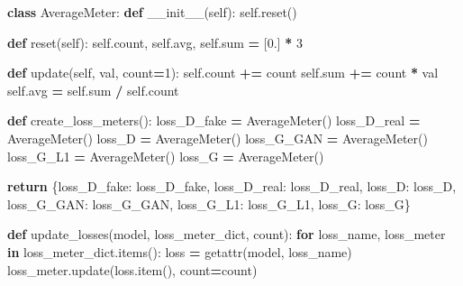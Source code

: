 \documentclass[
]{article}
\newenvironment{Shaded}{\begin{snugshade}}{\end{snugshade}}
\newcommand{\BuiltInTok}[1]{#1}
\newcommand{\ControlFlowTok}[1]{\textcolor[rgb]{0.13,0.29,0.53}{\textbf{#1}}}
\newcommand{\DecValTok}[1]{\textcolor[rgb]{0.00,0.00,0.81}{#1}}
\newcommand{\FloatTok}[1]{\textcolor[rgb]{0.00,0.00,0.81}{#1}}
\newcommand{\FunctionTok}[1]{\textcolor[rgb]{0.00,0.00,0.00}{#1}}
\newcommand{\KeywordTok}[1]{\textcolor[rgb]{0.13,0.29,0.53}{\textbf{#1}}}
\newcommand{\NormalTok}[1]{#1}
\newcommand{\OperatorTok}[1]{\textcolor[rgb]{0.81,0.36,0.00}{\textbf{#1}}}
\newcommand{\StringTok}[1]{\textcolor[rgb]{0.31,0.60,0.02}{#1}}
\newcommand{\VariableTok}[1]{\textcolor[rgb]{0.00,0.00,0.00}{#1}}
\begin{document}
\begin{Shaded}
\begin{Highlighting}[]
\KeywordTok{class}\NormalTok{ AverageMeter:}
    \KeywordTok{def} \FunctionTok{\_\_init\_\_}\NormalTok{(}\VariableTok{self}\NormalTok{):}
        \VariableTok{self}\NormalTok{.reset()}
        
    \KeywordTok{def}\NormalTok{ reset(}\VariableTok{self}\NormalTok{):}
        \VariableTok{self}\NormalTok{.count, }\VariableTok{self}\NormalTok{.avg, }\VariableTok{self}\NormalTok{.}\BuiltInTok{sum} \OperatorTok{=}\NormalTok{ [}\FloatTok{0.}\NormalTok{] }\OperatorTok{*} \DecValTok{3}
    
    \KeywordTok{def}\NormalTok{ update(}\VariableTok{self}\NormalTok{, val, count}\OperatorTok{=}\DecValTok{1}\NormalTok{):}
        \VariableTok{self}\NormalTok{.count }\OperatorTok{+=}\NormalTok{ count}
        \VariableTok{self}\NormalTok{.}\BuiltInTok{sum} \OperatorTok{+=}\NormalTok{ count }\OperatorTok{*}\NormalTok{ val}
        \VariableTok{self}\NormalTok{.avg }\OperatorTok{=} \VariableTok{self}\NormalTok{.}\BuiltInTok{sum} \OperatorTok{/} \VariableTok{self}\NormalTok{.count}

\KeywordTok{def}\NormalTok{ create\_loss\_meters():}
\NormalTok{    loss\_D\_fake }\OperatorTok{=}\NormalTok{ AverageMeter()}
\NormalTok{    loss\_D\_real }\OperatorTok{=}\NormalTok{ AverageMeter()}
\NormalTok{    loss\_D }\OperatorTok{=}\NormalTok{ AverageMeter()}
\NormalTok{    loss\_G\_GAN }\OperatorTok{=}\NormalTok{ AverageMeter()}
\NormalTok{    loss\_G\_L1 }\OperatorTok{=}\NormalTok{ AverageMeter()}
\NormalTok{    loss\_G }\OperatorTok{=}\NormalTok{ AverageMeter()}
    
    \ControlFlowTok{return}\NormalTok{ \{}\StringTok{\textquotesingle{}loss\_D\_fake\textquotesingle{}}\NormalTok{: loss\_D\_fake,}
            \StringTok{\textquotesingle{}loss\_D\_real\textquotesingle{}}\NormalTok{: loss\_D\_real,}
            \StringTok{\textquotesingle{}loss\_D\textquotesingle{}}\NormalTok{: loss\_D,}
            \StringTok{\textquotesingle{}loss\_G\_GAN\textquotesingle{}}\NormalTok{: loss\_G\_GAN,}
            \StringTok{\textquotesingle{}loss\_G\_L1\textquotesingle{}}\NormalTok{: loss\_G\_L1,}
            \StringTok{\textquotesingle{}loss\_G\textquotesingle{}}\NormalTok{: loss\_G\}}

\KeywordTok{def}\NormalTok{ update\_losses(model, loss\_meter\_dict, count):}
    \ControlFlowTok{for}\NormalTok{ loss\_name, loss\_meter }\KeywordTok{in}\NormalTok{ loss\_meter\_dict.items():}
\NormalTok{        loss }\OperatorTok{=} \BuiltInTok{getattr}\NormalTok{(model, loss\_name)}
\NormalTok{        loss\_meter.update(loss.item(), count}\OperatorTok{=}\NormalTok{count)}


\end{Highlighting}
\end{Shaded}
\end{document}

